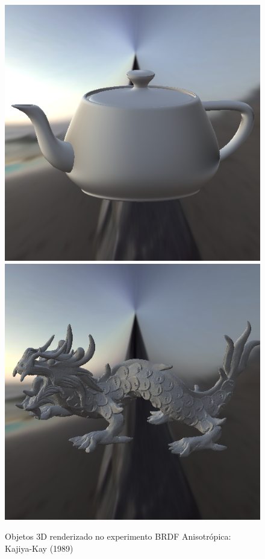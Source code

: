 \begin{figure}[H]
    \caption{\small{Objetos 3D renderizado no experimento BRDF Anisotrópica: Kajiya-Kay (1989)}}\label{fig-kajiya-eqlang}
  \includegraphics[width=\linewidth]{./Imagens/brdfs/aniso-teapot.png}
\endminipage\hfill
{}
  \includegraphics[width=\linewidth]{./Imagens/brdfs/aniso-dragon.png}

\end{figure}
